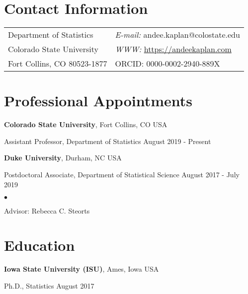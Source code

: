 \documentclass[margin,line]{res}
\newenvironment{list1}{
  \begin{list}{\ding{113}}{%
      \setlength{\itemsep}{0in}
      \setlength{\parsep}{0in} \setlength{\parskip}{0in}
      \setlength{\topsep}{0in} \setlength{\partopsep}{0in}
      \setlength{\leftmargin}{0.17in}}}{\end{list}}
\newenvironment{list2}{
  \begin{list}{$\bullet$}{%
      \setlength{\itemsep}{0in}
      \setlength{\parsep}{0in} \setlength{\parskip}{0in}
      \setlength{\topsep}{0in} \setlength{\partopsep}{0in}
      \setlength{\leftmargin}{0.2in}}}{\end{list}}
\begin{document}
\nocite{*}

\begin{resume}

\section{\sc Contact Information}
\vspace{.05in}
\begin{tabular}{@{}p{2in}p{4in}}
Department of Statistics  & {\it E-mail:} andee.kaplan@colostate.edu\\
Colorado State University &  {\it WWW:} \url{https://andeekaplan.com} \\
Fort Collins, CO 80523-1877 & ORCID: 0000-0002-2940-889X\\
\end{tabular}

\section{\sc Professional Appointments}
{\bf Colorado State University}, Fort Collins, CO USA\\
\vspace*{-.1in}
\begin{list1}
\item[] Assistant Professor, Department of Statistics \hfill August 2019 - Present
\end{list1}

{\bf Duke University}, Durham, NC USA\\
\vspace*{-.1in}
\begin{list1}
\item[] Postdoctoral Associate, Department of Statistical Science \hfill August 2017 - July 2019

\begin{list2}
\vspace*{.05in}
\item[] Advisor: Rebecca C. Steorts
\end{list2}
\end{list1}

\section{\sc Education}
{\bf Iowa State University (ISU)}, Ames, Iowa USA\\
\vspace*{-.1in}
\begin{list1}
\item[]Ph.D., Statistics \hfill August 2017 


\end{list1}
\end{resume}
\end{document}
